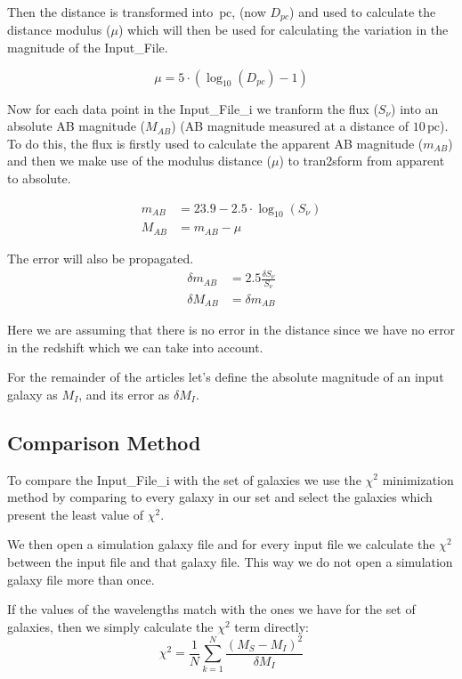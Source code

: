 \documentclass[11pt]{report}
\newcommand{\unit}[1]{\ensuremath{\, \mathrm{#1}}}
\begin{document}
Then the distance is transformed into $\unit{pc}$, (now $D_{pc}$) and used to calculate the distance modulus ($\mu$) which will then be used for calculating the variation in the magnitude of the Input\_File.

\begin{equation}
\mu = 5 \cdot ( \log_{10}( D_{pc}) - 1)
\end{equation}

Now for each data point in the Input\_File\_i we tranform the flux ($S_\nu$) into an absolute AB magnitude ($M_{AB}$) (AB magnitude measured at a distance of $10 \unit{pc}$). To do this, the flux is firstly used to calculate the apparent AB magnitude ($m_{AB}$) and then we make use of the modulus distance ($\mu$) to tran2sform from apparent to absolute.

\begin{align}
m_{AB} &= 23.9 - 2.5 \cdot \log_{10}(S_\nu)\\
M_{AB} &= m_{AB} - \mu
\end{align}

The error will also be propagated.
\begin{align*}
\delta m_{AB} &= 2.5 \frac{\delta S_\nu}{S_\nu}\\
\delta M_{AB} &= \delta m_{AB}
\end{align*}

Here we are assuming that there is no error in the distance since we have no error in the redshift which we can take into account.

For the remainder of the articles let's define the absolute magnitude of an input galaxy as $M_{I}$, and its error as $\delta M_I$.

\subsection{Comparison Method}
To compare the Input\_File\_i with the set of galaxies we use the $\chi^2$ minimization method by comparing to every galaxy in our set and select the galaxies which present the least value of $\chi^2$.

We then open a simulation galaxy file and for every input file we calculate the $\chi^2$ between the input file and that galaxy file. This way we do not open a simulation galaxy file more than once.

If the values of the wavelengths match with the ones we have for the set of galaxies, then we simply calculate the $\chi^2$ term directly:
\begin{equation}
\chi^2 = \frac{1}{N}\sum_{k=1}^N \frac{(M_S - M_I)^2}{\delta M_I}
\end{equation}
\end{document}
